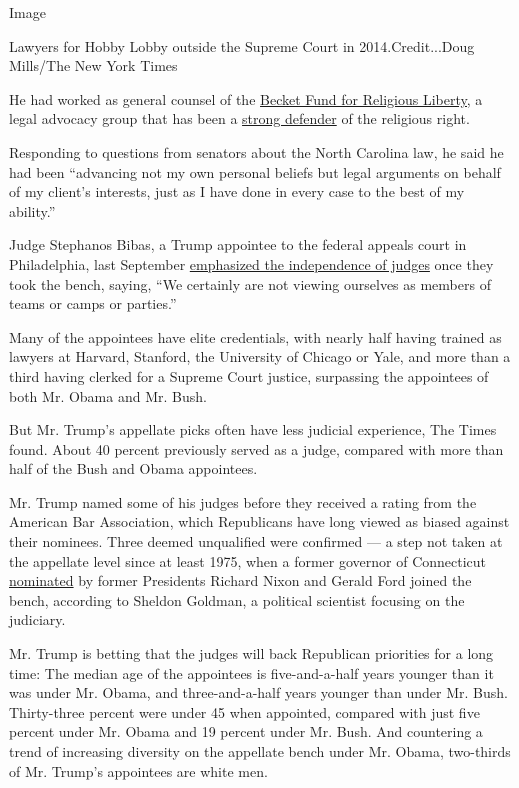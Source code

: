 Image

Lawyers for Hobby Lobby outside the Supreme Court in 2014.Credit...Doug
Mills/The New York Times

He had worked as general counsel of the
\href{https://www.becketlaw.org/about-us/history/}{Becket Fund for
Religious Liberty,} a legal advocacy group that has been a
\href{https://www.washingtonpost.com/politics/becket-fund-law-firm-gaining-a-reputation-as-powerhouse-after-hobby-lobby-win/2014/07/20/c28931a4-104c-11e4-8936-26932bcfd6ed_story.html}{strong
defender} of the religious right.

Responding to questions from senators about the North Carolina law, he
said he had been ``advancing not my own personal beliefs but legal
arguments on behalf of my client's interests, just as I have done in
every case to the best of my ability.''

Judge Stephanos Bibas, a Trump appointee to the federal appeals court in
Philadelphia, last September
\href{https://www.wsj.com/articles/judges-say-they-arent-extensions-of-presidents-who-appointed-them-11568566598}{emphasized
the independence of judges} once they took the bench, saying, ``We
certainly are not viewing ourselves as members of teams or camps or
parties.''

Many of the appointees have elite credentials, with nearly half having
trained as lawyers at Harvard, Stanford, the University of Chicago or
Yale, and more than a third having clerked for a Supreme Court justice,
surpassing the appointees of both Mr. Obama and Mr. Bush.

But Mr. Trump's appellate picks often have less judicial experience, The
Times found. About 40 percent previously served as a judge, compared
with more than half of the Bush and Obama appointees.

Mr. Trump named some of his judges before they received a rating from
the American Bar Association, which Republicans have long viewed as
biased against their nominees. Three deemed unqualified were confirmed
--- a step not taken at the appellate level since at least 1975, when a
former governor of Connecticut
\href{https://timesmachine.nytimes.com/timesmachine/1975/03/22/92190255.html?pageNumber=20}{nominated}
by former Presidents Richard Nixon and Gerald Ford joined the bench,
according to Sheldon Goldman, a political scientist focusing on the
judiciary.

Mr. Trump is betting that the judges will back Republican priorities for
a long time: The median age of the appointees is five-and-a-half years
younger than it was under Mr. Obama, and three-and-a-half years younger
than under Mr. Bush. Thirty-three percent were under 45 when appointed,
compared with just five percent under Mr. Obama and 19 percent under Mr.
Bush. And countering a trend of increasing diversity on the appellate
bench under Mr. Obama, two-thirds of Mr. Trump's appointees are white
men.

